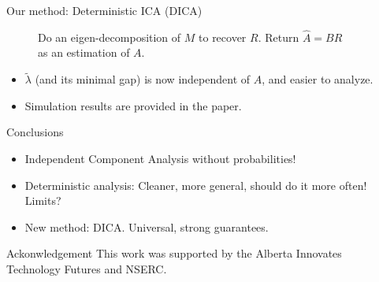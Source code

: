\documentclass[final]{beamer} %
\begin{document}
\begin{frame}[c]
\begin{columns}[t,totalwidth=\textwidth]
\begin{column}{0.32\textwidth}
\begin{block}{Our method: Deterministic ICA (DICA)}
\begin{figure}
\begin{algorithmic}[1]
				\STATE Do an eigen-decomposition of $M$ to recover $R$.
				\STATE Return $\hat{A} = BR$ as an estimation of $A$. 
			\end{algorithmic}
			\end{figure}
			\begin{itemize}
				\item $\tilde{\lambda}$ (and its minimal gap) is now independent of $A$, and easier to analyze.
				\item Simulation results are provided in the paper.
			\end{itemize}
		\end{block}
		\vspace{0.5ex}
		\begin{block}{Conclusions}
		\begin{itemize}
		\item Independent Component Analysis without probabilities! 
		\item Deterministic analysis: Cleaner, more general, should do it more often! Limits?
		\item New method: DICA. Universal, strong guarantees.
		\end{itemize}
		\end{block}
		\vspace{0.5ex}
		\begin{block}{Ackonwledgement}
This work was supported by the Alberta Innovates Technology Futures and NSERC.
		\end{block}
	\end{column}
		
	\begin{column}{0.01\textwidth}
	\end{column}
\end{columns}
 
\end{frame}
\end{document}
